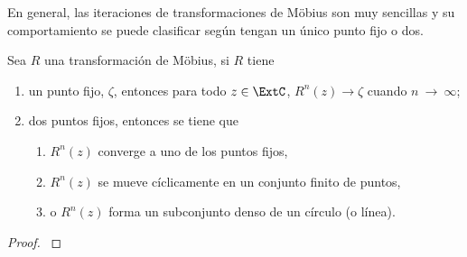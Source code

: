 En general, las iteraciones de transformaciones de Möbius son muy sencillas y su
comportamiento se puede clasificar según tengan un único punto fijo o dos.

\begin{teorema}
Sea $R$ una transformación de Möbius, si $R$ tiene
\begin{enumerate}
    \item un punto fijo, $\zeta$, entonces para todo $z \in \ExtC$,
        $R^n(z) \to \zeta$ cuando $n~\to~\infty$;
    \item dos puntos fijos, entonces se tiene que
    \begin{enumerate}
        \item $R^n(z)$ converge a uno de los puntos fijos,
        \item $R^n(z)$ se mueve cíclicamente en un conjunto finito de puntos,
        \item o $R^n(z)$ forma un subconjunto denso de un círculo (o línea).
    \end{enumerate}
\end{enumerate}
\end{teorema}

\begin{proof}
    \cite[Ver][4-5]{Beardon1991}
\end{proof}